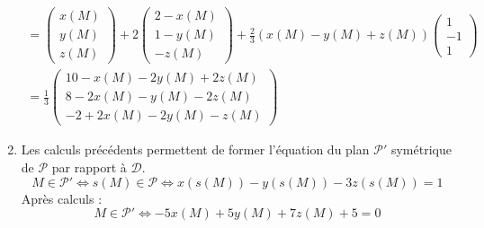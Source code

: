 \begin{enumerate}
\begin{multline*}
=
\begin{pmatrix}
 x(M)\\y(M)\\z(M)
\end{pmatrix}
+2\begin{pmatrix}
 2-x(M)\\1-y(M)\\-z(M)
\end{pmatrix}
+\frac{2}{3}\left(x(M)-y(M)+z(M) \right)
\begin{pmatrix}
 1\\-1\\1
\end{pmatrix}
 \\
=
\frac{1}{3}
\begin{pmatrix}
 10 -x(M) -2 y(M) +2z(M)\\
 8 -2x(M)-y(M) -2z(M)\\
 -2 + 2x(M) -2y(M) - z(M)
\end{pmatrix}
\end{multline*}

 \item Les calculs précédents permettent de former l'équation du plan $\mathcal{P}'$ symétrique de $\mathcal{P}$ par rapport à $\mathcal{D}$.
\begin{displaymath}
 M\in \mathcal P'\Leftrightarrow s(M) \in \mathcal{P}
\Leftrightarrow
x(s(M))-y(s(M))-3z(s(M))=1
\end{displaymath}
Après calculs :
\begin{displaymath}
 M\in \mathcal P'\Leftrightarrow
-5x(M)+5y(M)+7z(M)+5 = 0
\end{displaymath}
\end{enumerate}
